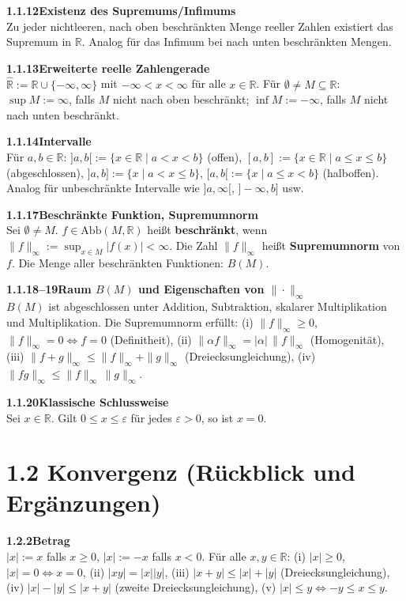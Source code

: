 \documentclass[a4paper,12pt]{article}
\newcommand{\gentry}[3]{%
  \noindent\textbf{#1\quad #2}\nopagebreak\\[0.2em]
  #3\par\smallskip
}
\begin{document}
\gentry{1.1.12}{Existenz des Supremums/Infimums}{%
  Zu jeder nichtleeren, nach oben beschränkten Menge reeller Zahlen existiert das Supremum in $\mathbb{R}$.
  Analog für das Infimum bei nach unten beschränkten Mengen.
}

\gentry{1.1.13}{Erweiterte reelle Zahlengerade}{%
  $\widehat{\mathbb{R}} := \mathbb{R} \cup \{-\infty, \infty\}$ mit $-\infty < x < \infty$ für alle $x \in \mathbb{R}$.
  Für $\emptyset \neq M \subseteq \mathbb{R}$: $\sup M := \infty$, falls $M$ nicht nach oben beschränkt;
  $\inf M := -\infty$, falls $M$ nicht nach unten beschränkt.
}

\gentry{1.1.14}{Intervalle}{%
  Für $a, b \in \mathbb{R}$:
  $]a,b[ := \{x \in \mathbb{R} \mid a < x < b\}$ (offen),
  $[a,b] := \{x \in \mathbb{R} \mid a \leq x \leq b\}$ (abgeschlossen),
  $]a,b] := \{x \mid a < x \leq b\}$, $[a,b[ := \{x \mid a \leq x < b\}$ (halboffen).
  Analog für unbeschränkte Intervalle wie $]a, \infty[$, $]-\infty, b]$ usw.
}

\gentry{1.1.17}{Beschränkte Funktion, Supremumnorm}{%
  Sei $\emptyset \neq M$. $f \in \mathrm{Abb}(M, \mathbb{R})$ heißt \textbf{beschränkt}, wenn
  $\|f\|_\infty := \sup_{x \in M} |f(x)| < \infty$. Die Zahl $\|f\|_\infty$ heißt
  \textbf{Supremumnorm} von $f$. Die Menge aller beschränkten Funktionen: $B(M)$.
}

\gentry{1.1.18--19}{Raum $B(M)$ und Eigenschaften von $\|\cdot\|_\infty$}{%
  $B(M)$ ist abgeschlossen unter Addition, Subtraktion, skalarer Multiplikation und
  Multiplikation. Die Supremumnorm erfüllt:
  (i) $\|f\|_\infty \geq 0$, $\|f\|_\infty = 0 \Leftrightarrow f = 0$ (Definitheit),
  (ii) $\|\alpha f\|_\infty = |\alpha|\,\|f\|_\infty$ (Homogenität),
  (iii) $\|f+g\|_\infty \leq \|f\|_\infty + \|g\|_\infty$ (Dreiecksungleichung),
  (iv) $\|fg\|_\infty \leq \|f\|_\infty\,\|g\|_\infty$.
}

\gentry{1.1.20}{Klassische Schlussweise}{%
  Sei $x \in \mathbb{R}$. Gilt $0 \leq x \leq \varepsilon$ für jedes $\varepsilon > 0$, so ist $x = 0$.
}

\section*{1.2 \quad Konvergenz (Rückblick und Ergänzungen)}

\gentry{1.2.2}{Betrag}{%
  $|x| := x$ falls $x \geq 0$, $|x| := -x$ falls $x < 0$.
  Für alle $x, y \in \mathbb{R}$:
  (i) $|x| \geq 0$, $|x| = 0 \Leftrightarrow x = 0$,
  (ii) $|xy| = |x||y|$,
  (iii) $|x+y| \leq |x| + |y|$ (Dreiecksungleichung),
  (iv) $|x| - |y| \leq |x+y|$ (zweite Dreiecksungleichung),
  (v) $|x| \leq y \Leftrightarrow -y \leq x \leq y$.
}
\end{document}
